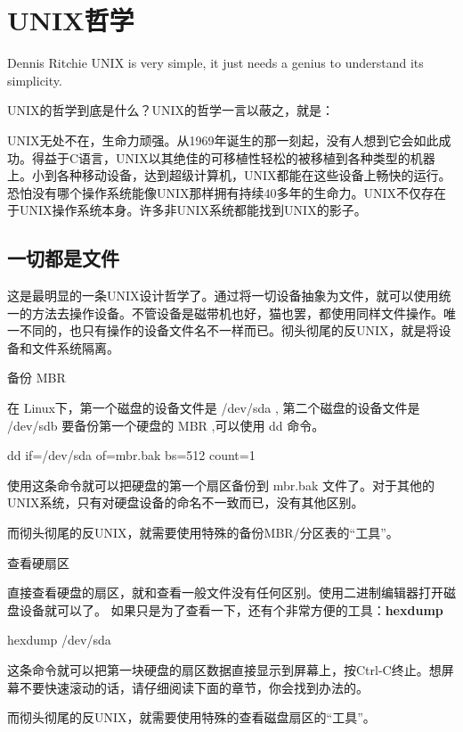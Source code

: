 \chapter{UNIX哲学}
\begin{quotes}{Dennis Ritchie}
UNIX is very simple, it just needs a genius to understand its simplicity.
\end{quotes}

UNIX的哲学到底是什么？UNIX的哲学一言以蔽之，就是：


UNIX无处不在，生命力顽强。从1969年诞生的那一刻起，没有人想到它会如此成功。得益于C语言，UNIX以其绝佳的可移植性轻松的被移植到各种类型的机器上。小到各种移动设备，达到超级计算机，UNIX都能在这些设备上畅快的运行。恐怕没有哪个操作系统能像UNIX那样拥有持续40多年的生命力。UNIX不仅存在于UNIX操作系统本身。许多非UNIX系统都能找到UNIX的影子。



\section{一切都是文件}

这是最明显的一条UNIX设计哲学了。通过将一切设备抽象为文件，就可以使用统一的方法去操作设备。不管设备是磁带机也好，猫也罢，都使用同样文件操作。唯一不同的，也只有操作的设备文件名不一样而已。彻头彻尾的反UNIX，就是将设备和文件系统隔离。

\begin{example}{备份 MBR}

在 Linux下，第一个磁盘的设备文件是 /dev/sda , 第二个磁盘的设备文件是 /dev/sdb 
要备份第一个硬盘的 MBR ,可以使用  dd 命令。

\begin{code}
dd if=/dev/sda of=mbr.bak bs=512 count=1
\end{code}

使用这条命令就可以把硬盘的第一个扇区备份到 mbr.bak 文件了。对于其他的UNIX系统，只有对硬盘设备的命名不一致而已，没有其他区别。

而彻头彻尾的反UNIX，就需要使用特殊的备份MBR/分区表的“工具”。
\end{example}


\begin{example}{查看硬扇区}

直接查看硬盘的扇区，就和查看一般文件没有任何区别。使用二进制编辑器打开磁盘设备就可以了。
如果只是为了查看一下，还有个非常方便的工具：\textbf{hexdump}

\begin{code}
hexdump /dev/sda
\end{code}

这条命令就可以把第一块硬盘的扇区数据直接显示到屏幕上，按Ctrl-C终止。想屏幕不要快速滚动的话，请仔细阅读下面的章节，你会找到办法的。

而彻头彻尾的反UNIX，就需要使用特殊的查看磁盘扇区的“工具”。
\end{example}

